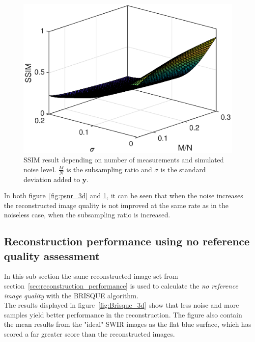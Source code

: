 \begin{figure}[H]
    \centering
    \includegraphics[width = 0.7\linewidth]{result/synt_sss/SSIM_fit.eps}
    \caption{SSIM result depending on number of measurements and simulated noise level. $\frac{M}{N}$ is the subsampling ratio and $\sigma$ is the standard deviation added to $\mathbf{y}$.}
    \label{fig:ssim_3d}
\end{figure}

In both figure~\ref{fig:psnr_3d} and \ref{fig:ssim_3d}, it can be seen that when the noise increases the reconstructed image quality is not improved at the same rate as in the noiseless case, when the subsampling ratio is increased.

\subsection{Reconstruction performance using no reference quality assessment}
In this sub section the same reconstructed image set from section~\ref{sec:reconstruction_performance} is used to calculate the \textit{no reference image quality} with the BRISQUE algorithm.\\[0.1in] 

The results displayed in figure~\ref{fig:Brisque_3d} show that less noise and more samples yield better performance in the reconstruction. The figure also contain the mean results from the "ideal" SWIR images as the flat blue surface, which has scored a far greater score than the reconstructed images.
  

